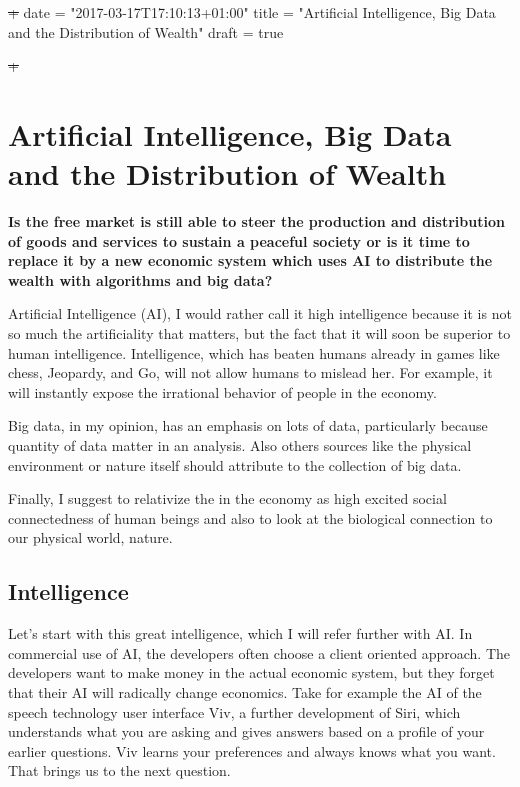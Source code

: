 \documentclass[11pt]{article}
\author{Michel Mooij}
\date{\today}
\title{}
\begin{document}
\tableofcontents

\sout{+}
date = "2017-03-17T17:10:13+01:00"
title = "Artificial Intelligence, Big Data and the Distribution of Wealth"
draft = true

\sout{+}
\section{Artificial Intelligence, Big Data and the Distribution of Wealth}
\label{sec:orgdf4ee51}

\textbf{Is the free market is still able to steer the production and distribution of goods and services to sustain a peaceful society or is it time to replace it by a new economic system which uses AI to distribute the wealth with algorithms and big data?}

Artificial Intelligence (AI), I would rather call it high intelligence because it is not so much the artificiality that matters, but the fact that it will soon be superior to human intelligence. Intelligence, which has beaten humans already in games like chess, Jeopardy, and Go, will not allow humans to mislead her. For example, it will instantly expose the irrational behavior of people in the economy.

Big data, in my opinion, has an emphasis on lots of data, particularly because quantity of data matter in an analysis. Also others sources like the physical environment or nature itself should attribute to the collection of big data.

Finally, I suggest to relativize the in the economy as high excited social connectedness of human beings and also to look at the biological connection to our physical world, nature.

\subsection{Intelligence}
\label{sec:org1e0f396}

Let’s start with this great intelligence, which I will refer further with AI. In commercial use of AI, the developers often choose a client oriented approach. The developers want to make money in the actual economic system, but they forget that their AI will radically change economics. Take for example the AI of the speech technology user interface Viv, a further development of Siri, which understands what you are asking and gives answers based on a profile of your earlier questions. Viv learns your preferences and always knows what you want. That brings us to the next question.
\end{document}
